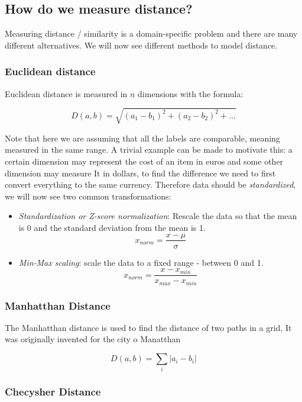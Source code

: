 \documentclass[11pt]{article}
\begin{document}
\subsection{How do we measure
distance?}\label{how-do-we-measure-distance}

Measuring distance / similarity is a domain-specific problem and there
are many different alternatives. We will now see different methods to
model distance.

\subsubsection{Euclidean distance}\label{euclidean-distance}

Euclidean distance is measured in \(n\) dimensions with the formula:

\[D(a, b) = \sqrt{(a_1 - b_1)^2 + (a_2 - b_2)^2+...}\]

Note that here we are assuming that all the labels are comparable,
meaning measured in the same range. A trivial example can be made to
motivate this: a certain dimension may represent the cost of an item in
euros and some other dimension may measure It in dollars, to find the
difference we need to first convert everything to the same currency.
Therefore data should be \emph{standardized}, we will now see two common
transformations:

\begin{itemize}
\tightlist
\item
  \emph{Standardization or Z-score normalization}: Rescale the data so
  that the mean is 0 and the standard deviation from the mean is 1.
  \[x_{norm}=\frac{x-\mu}{\sigma}\]
\item
  \emph{Min-Max scaling}: scale the data to a fixed range - between 0
  and 1. \[x_{norm}=\frac{x-x_{min}}{x_{max}-x_{min}}\]
\end{itemize}

\subsubsection{Manhatthan Distance}\label{manhatthan-distance}

The Manhatthan distance is used to find the distance of two paths in a
grid, It was originally invented for the city o Manatthan

\[D(a, b)=\sum_i |a_i - b_i|\]

\subsubsection{Checysher Distance}\label{checysher-distance}
\end{document}
